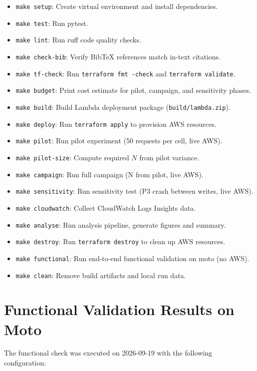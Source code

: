\begin{itemize}
    \item \texttt{make setup}: Create virtual environment and install dependencies.
    \item \texttt{make test}: Run pytest.
    \item \texttt{make lint}: Run ruff code quality checks.
    \item \texttt{make check-bib}: Verify BibTeX references match in-text citations.
    \item \texttt{make tf-check}: Run \texttt{terraform fmt -check} and \texttt{terraform validate}.
    \item \texttt{make budget}: Print cost estimate for pilot, campaign, and sensitivity phases.
    \item \texttt{make build}: Build Lambda deployment package (\texttt{build/lambda.zip}).
    \item \texttt{make deploy}: Run \texttt{terraform apply} to provision AWS resources.
    \item \texttt{make pilot}: Run pilot experiment (50 requests per cell, live AWS).
    \item \texttt{make pilot-size}: Compute required $N$ from pilot variance.
    \item \texttt{make campaign}: Run full campaign (N from pilot, live AWS).
    \item \texttt{make sensitivity}: Run sensitivity test (P3 crash between writes, live AWS).
    \item \texttt{make cloudwatch}: Collect CloudWatch Logs Insights data.
    \item \texttt{make analyse}: Run analysis pipeline, generate figures and summary.
    \item \texttt{make destroy}: Run \texttt{terraform destroy} to clean up AWS resources.
    \item \texttt{make functional}: Run end-to-end functional validation on moto (no AWS).
    \item \texttt{make clean}: Remove build artifacts and local run data.
\end{itemize}

\section{Functional Validation Results on Moto}

The functional check was executed on 2026-09-19 with the following configuration:

